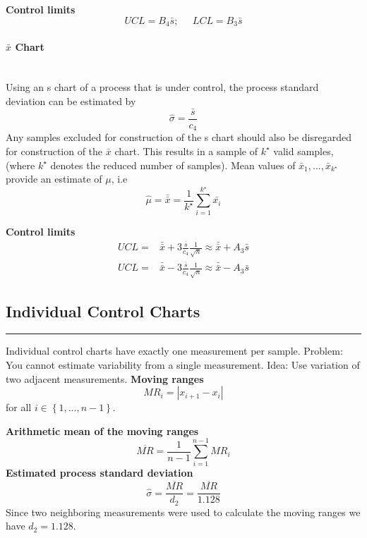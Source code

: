\textbf{Control limits}
\begin{equation}
    UCL = B_4 \bar{s}; \;\;\;\;\;  LCL = B_3 \bar{s}
\end{equation}

\paragraph{$\bar{x}$ Chart}\mbox{}\\
Using an s chart of a process that is under control, the process standard deviation can be estimated by
\begin{equation}
  \hat{\sigma} = \frac{\bar{s}}{c_4}
\end{equation}
Any samples excluded for construction of the s chart should also be disregarded for construction of the $\bar{x}$ chart.
This results in a sample of $k^\star$ valid samples, (where $k^\star$ denotes the reduced number of samples).
Mean values of $\bar{x}_1, ... ,\bar{x}_{k^\star}$ provide an estimate of $\mu$, i.e
\begin{equation}
  \hat{\mu} = \bar{\bar{x}} = \frac{1}{k^\star} \sum^{k^\star}_{i=1} \bar{x_i}
\end{equation}

\textbf{Control limits}
\begin{equation}
  \begin{split}
    UCL =& \bar{\bar{x}} + 3\frac{\bar{s}}{c_4} \frac{1}{\sqrt{n}} \approx \bar{\bar{x}} + A_3 \bar{s}\\
    UCL =& \bar{\bar{x}} - 3\frac{\bar{s}}{c_4} \frac{1}{\sqrt{n}} \approx \bar{\bar{x}} - A_3 \bar{s}
  \end{split}
\end{equation}

\subsection{Individual Control Charts}
\noindent\rule[\linienAbstand]{\linewidth}{\linienDicke}
Individual control charts have exactly one measurement per sample.
Problem: You cannot estimate variability from a single measurement.
Idea: Use variation of two adjacent measurements.
\textbf{Moving ranges}
\begin{equation}
  MR_i = |x_{i+1} - x_i|
\end{equation}
for all $i \in \left\{1,...,n-1\right\}$.

\textbf{Arithmetic mean of the moving ranges}
\begin{equation}
  \overline{MR} = \frac{1}{n-1} \sum_{i=1}^{n-1}MR_i
\end{equation}
\textbf{Estimated process standard deviation}
\begin{equation}
  \hat{\sigma} = \frac{\overline{MR}}{d_2} = \frac{\overline{MR}}{1.128}
\end{equation}
Since two neighboring measurements were used to calculate the moving ranges we have $d_2 = 1.128$.

